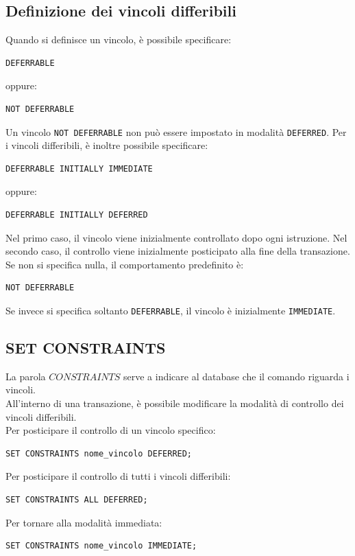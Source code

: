 \subsection{Definizione dei vincoli differibili}
Quando si definisce un vincolo,
è possibile specificare:
\begin{verbatim}
DEFERRABLE
\end{verbatim}
oppure:
\begin{verbatim}
NOT DEFERRABLE
\end{verbatim}
Un vincolo \texttt{NOT DEFERRABLE}
non può essere impostato in
modalità \texttt{DEFERRED}.
Per i vincoli differibili,
è inoltre possibile specificare:
\begin{verbatim}
DEFERRABLE INITIALLY IMMEDIATE
\end{verbatim}
oppure:
\begin{verbatim}
DEFERRABLE INITIALLY DEFERRED
\end{verbatim}
Nel primo caso, il vincolo viene
inizialmente controllato dopo
ogni istruzione.
Nel secondo caso, il controllo
viene inizialmente posticipato
alla fine della transazione.
Se non si specifica nulla,
il comportamento predefinito è:
\begin{verbatim}
NOT DEFERRABLE
\end{verbatim}
Se invece si specifica soltanto
\texttt{DEFERRABLE}, il vincolo
è inizialmente \texttt{IMMEDIATE}.
\subsection{SET CONSTRAINTS}
La parola $CONSTRAINTS$ serve a indicare al database che il comando riguarda i vincoli.\\
All'interno di una transazione,
è possibile modificare la modalità
di controllo dei vincoli differibili.\\
Per posticipare il controllo
di un vincolo specifico:
\begin{verbatim}
SET CONSTRAINTS nome_vincolo DEFERRED;
\end{verbatim}
Per posticipare il controllo
di tutti i vincoli differibili:
\begin{verbatim}
SET CONSTRAINTS ALL DEFERRED;
\end{verbatim}
Per tornare alla modalità immediata:
\begin{verbatim}
SET CONSTRAINTS nome_vincolo IMMEDIATE;
\end{verbatim}
